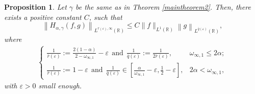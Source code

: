 \documentclass[11pt, twoside, leqno]{article}
\newtheorem{proposition}[theorem]{Proposition}
\theoremstyle{definition}
\numberwithin{equation}{section}
\begin{document}
\begin{proposition}\label{proposition 4.2}
Let $\gamma $ be the same as in Theorem \ref{maintheorem2}. Then, there exists a positive constant $C$, such that
$$\left\|H_{\alpha,\gamma}(f,g)\right\|_{L^{\bar{r}(\varepsilon),\infty}(\mathbb{R})}\leq C \|f\|_{L^{1}(\mathbb{R})}\left\|g\right\|_{L^{\bar{q}(\varepsilon)}(\mathbb{R})},$$
where
\begin{align*}
\begin{cases}
\frac{1}{\bar{r}(\varepsilon )}:= \frac{2(1-\alpha)}{2-\omega_{\infty,1}}-\varepsilon ~~\textrm{and}~~\frac{1}{\bar{q}(\varepsilon )}:=\frac{1}{2\bar{r}(\varepsilon )}   ,&\omega_{\infty,1}\leq2\alpha;\\
\frac{1}{\bar{r}(\varepsilon )}:= 1-\varepsilon  ~~\textrm{and}~~\frac{1}{\bar{q}(\varepsilon )}\in \left[\frac{\alpha}{\omega_{\infty,1}}-\varepsilon, \frac{1}{2}-\varepsilon\right] ,& 2\alpha<\omega_{\infty,1},
\end{cases}
\end{align*}
with $\varepsilon>0$ small enough.
\end{proposition}
\end{document}
